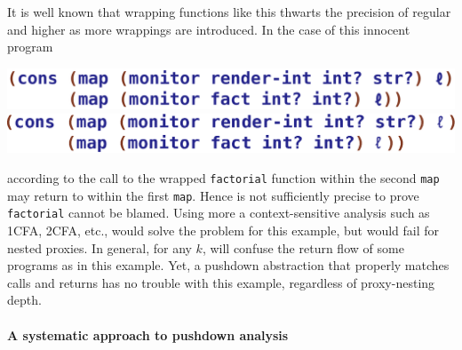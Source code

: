 It is well known that wrapping functions like this thwarts the
precision of regular \zcfa{} and higher \kcfa{} as more wrappings are
introduced.
%
In the case of this innocent program
 \begin{center}
\ifpdf
  \includegraphics[scale=0.45]{pair}
\else
  \includegraphics[scale=0.45]{pair.eps}
\fi
 \end{center}

according to \zcfa{} the call to the wrapped \texttt{factorial}
function within the second \texttt{map} may return to within the
first \texttt{map}.  Hence \zcfa{} is not sufficiently precise to 
prove \texttt{factorial} cannot be blamed.
%
Using more a context-sensitive analysis such as 1CFA, 2CFA, etc.,
would solve the problem for this example, but would fail for nested
proxies.
%
In general, for any $k$, \kcfa{} will confuse the return flow of some
programs as in this example.
%
Yet, a pushdown abstraction that properly matches calls and returns
has no trouble with this example, regardless of proxy-nesting depth.


%


\paragraph{A systematic approach to pushdown analysis}

